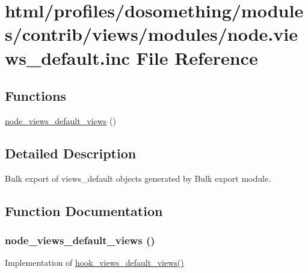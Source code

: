 \hypertarget{node_8views__default_8inc}{
\section{html/profiles/dosomething/modules/contrib/views/modules/node.views\_\-default.inc File Reference}
\label{node_8views__default_8inc}
}
\subsection*{Functions}
\begin{DoxyCompactItemize}
\item 
\hyperlink{node_8views__default_8inc_a6ed0122e0fb76b63b17d2a5a704e952b}{node\_\-views\_\-default\_\-views} ()
\end{DoxyCompactItemize}


\subsection{Detailed Description}
Bulk export of views\_\-default objects generated by Bulk export module. 

\subsection{Function Documentation}
\hypertarget{node_8views__default_8inc_a6ed0122e0fb76b63b17d2a5a704e952b}{
\subsubsection[{node\_\-views\_\-default\_\-views}]{\setlength{\rightskip}{0pt plus 5cm}node\_\-views\_\-default\_\-views ()}}
\label{node_8views__default_8inc_a6ed0122e0fb76b63b17d2a5a704e952b}
Implementation of \hyperlink{group__views__hooks_ga23edb74860682fa88f75cf94b97c2e15}{hook\_\-views\_\-default\_\-views()} 